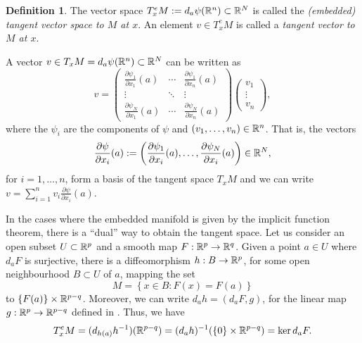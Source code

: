\documentclass[11pt,a4paper]{book}
\theoremstyle{remark} \newtheorem{rmk}[thm]{Remark}
\theoremstyle{definition} \newtheorem{defn}[thm]{Definition}
\theoremstyle{definition} \newtheorem{ex}[thm]{Example}
\theoremstyle{definition} \newtheorem{ej}[thm]{Exercise}
\begin{document}
\begin{defn}
The vector space $T^e_xM:=d_a \psi(\mathbb R^n)\subset \mathbb R^N$ is called the \emph{(embedded) tangent vector space to $M$ at $x$}. An element $v \in T^e_xM$ is called a \emph{tangent vector to $M$ at $x$}.
\end{defn}

A vector $v \in T_x M=d_a\psi (\mathbb R^n)\subset \mathbb R^N$ can be written as
\begin{equation*}
  v=
\begin{pmatrix}
\frac{\partial \psi_1}{\partial x_1}(a) & \cdots &\frac{\partial \psi_1}{\partial x_n}(a) \\
  \vdots & \ddots & \vdots \\
\frac{\partial \psi_N}{\partial x_1}(a) & \cdots &\frac{\partial \psi_N}{\partial x_n}(a)
\end{pmatrix}
\begin{pmatrix}
  v_1 \\
  \vdots \\
  v_n
\end{pmatrix},
\end{equation*}
where the $\psi_i$ are the components of $\psi$ and $(v_1,\dots,v_n)\in \mathbb R^n$. That is, the vectors
\begin{equation*}
\frac{\partial \psi}{\partial x_i}(a) := \left( \frac{\partial \psi_1}{\partial x_i}(a) , \dots, \frac{\partial \psi_N}{\partial x_i}(a)  \right) \in \mathbb R^N ,
\end{equation*}
for $i=1,\dots, n$, form a basis of the tangent space $T_xM$ and we can write $v=\sum_{i=1}^n v_i \frac{\partial \psi}{\partial x_i}(a)$.

In the cases where the embedded manifold is given by the implicit function theorem, there is a ``dual'' way to obtain the tangent space. Let us consider an open subset $U\subset \mathbb R^p$ and a smooth map $F:\mathbb R^p\rightarrow \mathbb R^q$. Given a point $a\in U$ where $d_aF$ is surjective, there is a diffeomorphism $h:B\rightarrow \mathbb R^p$, for some open neighbourhood $B \subset U$ of $a$, mapping the set
\begin{equation*}
M=\left\{ x \in B: F(x)=F(a) \right\}
\end{equation*}
to $\left\{ F(a) \right\}\times \mathbb R^{p-q}$. Moreover, we can write $d_a h = (d_aF, g)$, for the linear map $g:\mathbb R^p\rightarrow \mathbb R^{p-q}$ defined in . Thus, we have
\begin{equation*}
T^e_x M = (d_{h(a)} h^{-1})(\mathbb R^{p-q}) = (d_ah)^{-1}(\left\{ 0 \right\} \times \mathbb R^{p-q}) = \ker d_a F.
\end{equation*}
\end{document}
